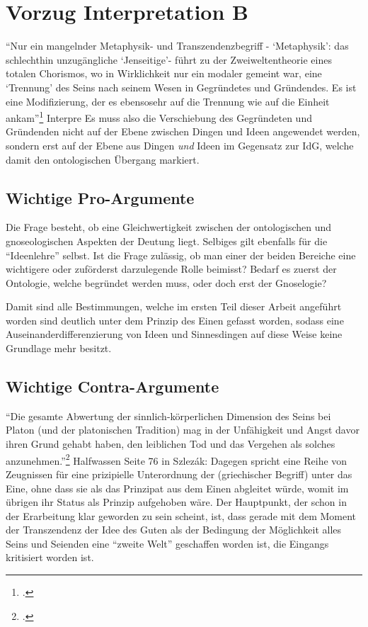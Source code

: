 \section{Vorzug Interpretation B}
\enquote{Nur ein mangelnder Metaphysik- und Transzendenzbegriff - \enquote{Metaphysik}: das schlechthin unzugängliche \enquote{Jenseitige}- führt zu der Zweiweltentheorie eines totalen Chorismos, wo in Wirklichkeit nur ein modaler gemeint war, eine \enquote{Trennung} des Seins nach seinem Wesen in Gegründetes und Gründendes. Es ist eine Modifizierung, der es ebensosehr auf die Trennung wie auf die Einheit ankam}\footcite[][S. 96]{Hirschberger} Interpre
Es muss also die Verschiebung des Gegründeten und Gründenden nicht auf der Ebene zwischen Dingen und Ideen angewendet werden, sondern erst auf der Ebene aus Dingen \emph{und} Ideen im Gegensatz zur IdG, welche damit den ontologischen Übergang markiert.
\subsection{Wichtige Pro-Argumente}
Die Frage besteht, ob eine Gleichwertigkeit zwischen der ontologischen und gnoseologischen Aspekten der Deutung liegt. Selbiges gilt ebenfalls für die \enquote{Ideenlehre} selbst. Ist die Frage zulässig, ob man einer der beiden Bereiche eine wichtigere oder zuförderst darzulegende Rolle beimisst? Bedarf es zuerst der Ontologie, welche begründet werden muss, oder doch erst der Gnoselogie?

Damit sind alle Bestimmungen, welche im ersten Teil dieser Arbeit angeführt worden sind deutlich unter dem Prinzip des Einen gefasst worden, sodass eine Auseinanderdifferenzierung von Ideen und Sinnesdingen auf diese Weise keine Grundlage mehr besitzt. 
\subsection{Wichtige Contra-Argumente}
\enquote{Die gesamte Abwertung der sinnlich-körperlichen Dimension des Seins bei Platon (und der platonischen Tradition) mag in der Unfähigkeit und Angst davor ihren Grund gehabt haben, den leiblichen Tod und das Vergehen als solches anzunehmen.}\footcite[][S. 99f.]{ThurnerDualismus}
Halfwassen Seite 76 in Szlezák: Dagegen spricht eine Reihe von Zeugnissen für eine prizipielle Unterordnung der (griechischer Begriff) unter das Eine, ohne dass sie als das Prinzipat aus dem Einen abgleitet würde, womit im übrigen ihr Status als Prinzip aufgehoben wäre.
Der Hauptpunkt, der schon in der Erarbeitung klar geworden zu sein scheint, ist, dass gerade mit dem Moment der Transzendenz der Idee des Guten als der Bedingung der Möglichkeit alles Seins und Seienden eine \enquote{zweite Welt} geschaffen worden ist, die Eingangs kritisiert worden ist.

